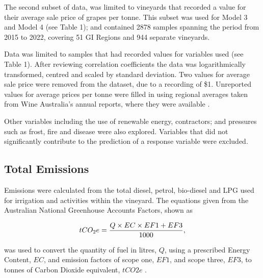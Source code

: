 \documentclass[12pt,australian]{article}
\begin{document}
\begin{sloppypar}
The second subset of data, was limited to vineyards that recorded a value for their average sale price of grapes per tonne. This subset was used for Model 3 and Model 4 (see Table 1); and contained 2878 samples spanning the period from 2015 to 2022, covering 51 GI Regions and 944 separate vineyards.

Data was limited to samples that had recorded values for variables used (see Table 1). After reviewing correlation coefficients the data was logarithmically transformed, centred and scaled by standard deviation. Two values for average sale price were removed from the dataset, due to a recording of \$1. Unreported values for average prices per tonne were filled in using regional averages taken from Wine Australia's annual reports, where they were available \autocite{wineaustraliaNationalVintageReport2019,wineaustraliaNationalVintageReport2020,wineaustraliaNationalVintageReport2021,wineaustraliaNationalVintageReport2022,winemakersfederationofaustraliaNationalVintageReport2012,winemakersfederationofaustraliaNationalVintageReport2013,winemakersfederationofaustraliaNationalVintageReport2014,winemakersfederationofaustraliaNationalVintageReport2015,winemakersfederationofaustraliaNationalVintageReport2016,winemakersfederationofaustraliaNationalVintageReport2017,winemakersfederationofaustraliaNationalVintageReport2018}.

Other variables including the use of renewable energy, contractors; and pressures such as frost, fire and disease were also explored. Variables that did not significantly contribute to the prediction of a response variable were excluded.

\subsection{Total Emissions}
Emissions were calculated from the total diesel, petrol, bio-diesel and LPG used for irrigation and activities within the vineyard. The equations given from the Australian National Greenhouse Accounts Factors, shown as 

\begin{equation}
\label{(1)}
    tCO_{2}e={{Q \times EC \times EF1 + EF3}\over{1000}},
\end{equation}

was used to convert the quantity of fuel in litres, $Q$, using a prescribed Energy Content, $EC$, and emission factors of scope one, $EF1$, and scope three, $EF3$, to tonnes of Carbon Dioxide equivalent, $tCO2e$ \autocite{departmentofclimatechangeenergytheenvironmentandwaterAustralianNationalGreenhouse2022}.


\end{sloppypar}
\end{document}
